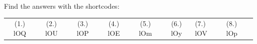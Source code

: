     
  \label{m30853**end}
      
\par {} Find the answers with the shortcodes:
 \par \begin{tabular}[h]{cccccc}
 (1.) lOQ  &  (2.) lOU  &  (3.) lOP  &  (4.) lOE  &  (5.) lOm  &  (6.) lOy  &  (7.) lOV  &  (8.) lOp  & \end{tabular}



